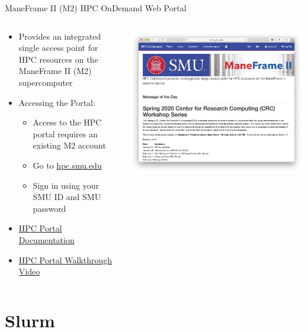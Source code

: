 \documentclass[aspectratio=169]{beamer}
\begin{document}
\begin{frame}{ManeFrame II (M2) HPC OnDemand Web Portal}
\begin{columns}[c]
\begin{column}{0.5\textwidth}
\begin{itemize}
\item Provides an integrated single access point for HPC resources on the
ManeFrame II (M2) supercomputer
\item Accessing the Portal:
\begin{itemize}
\item Access to the HPC portal requires an existing M2 account
\item Go to \url{hpc.smu.edu}
\item Sign in using your SMU ID and SMU password
\end{itemize}
\item \href{http://faculty.smu.edu/csc/documentation/portal.html}{HPC Portal
Documentation}
\item
\href{http://faculty.smu.edu/csc/documentation/portal.html\#remote-desktop}{HPC
Portal Walkthrough Video}
\end{itemize}
\end{column}
\begin{column}{0.5\textwidth}
\includegraphics[width=\linewidth]{figures/portal.png}
\end{column}
\end{columns}
\end{frame}

\section{Slurm}
\end{document}
